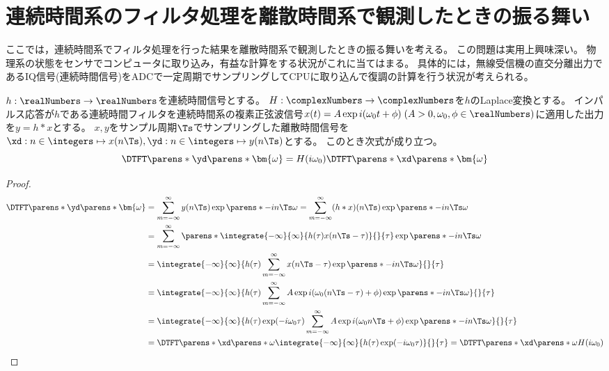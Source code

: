 \section{連続時間系のフィルタ処理を離散時間系で観測したときの振る舞い}
    ここでは，連続時間系でフィルタ処理を行った結果を離散時間系で観測したときの振る舞いを考える。
    この問題は実用上興味深い。
    物理系の状態をセンサでコンピュータに取り込み，有益な計算をする状況がこれに当てはまる。
    具体的には，無線受信機の直交分離出力であるIQ信号(連続時間信号)をADCで一定周期でサンプリングしてCPUに取り込んで復調の計算を行う状況が考えられる。
    \begin{shadebox}
        $h:\realNumbers\to\realNumbers$を連続時間信号とする。
        $H:\complexNumbers\to\complexNumbers$を$h$のLaplace変換とする。
        インパルス応答が$h$である連続時間フィルタを連続時間系の複素正弦波信号$x(t) = A\exp i(\omega_0 t + \phi)\;(A>0,\omega_0,\phi\in\realNumbers)$に適用した出力を$y=h*x$とする。
        $x,y$をサンプル周期$\Ts$でサンプリングした離散時間信号を$\xd: n\in\integers\mapsto x(n\Ts), \yd: n\in\integers\mapsto y(n\Ts)$とする。
        このとき次式が成り立つ。
        \[ \DTFT\parens*{\yd}\parens*{\bm{\omega}} = H(i\omega_0)\DTFT\parens*{\xd}\parens*{\bm{\omega}} \]
    \end{shadebox}
    \begin{proof}
        \begin{align*}
            \DTFT\parens*{\yd}\parens*{\bm{\omega}} &= \sum_{m=-\infty}^\infty y(n\Ts)\exp \parens*{-i n\Ts\omega} = \sum_{m=-\infty}^\infty (h*x)(n\Ts)\exp \parens*{-i n\Ts\omega} \\
            &= \sum_{m=-\infty}^\infty \parens*{\integrate{-\infty}{\infty}{h(\tau)x(n\Ts-\tau)}{}{\tau}}\exp \parens*{-i n\Ts\omega} \\
            &= \integrate{-\infty}{\infty}{h(\tau)\sum_{m=-\infty}^\infty x(n\Ts-\tau)\exp \parens*{-i n\Ts\omega}}{}{\tau} \\
            &= \integrate{-\infty}{\infty}{h(\tau)\sum_{m=-\infty}^\infty A\exp i(\omega_0 (n\Ts-\tau) + \phi)\exp \parens*{-i n\Ts\omega}}{}{\tau} \\
            &= \integrate{-\infty}{\infty}{h(\tau) \exp(-i\omega_0\tau)\sum_{m=-\infty}^\infty A\exp i(\omega_0 n\Ts + \phi)\exp \parens*{-i n\Ts\omega}}{}{\tau} \\
            &= \DTFT\parens*{\xd}\parens*{\omega} \integrate{-\infty}{\infty}{h(\tau) \exp(-i\omega_0\tau)}{}{\tau} = \DTFT\parens*{\xd}\parens*{\omega}H(i\omega_0)
        \end{align*}
    \end{proof}